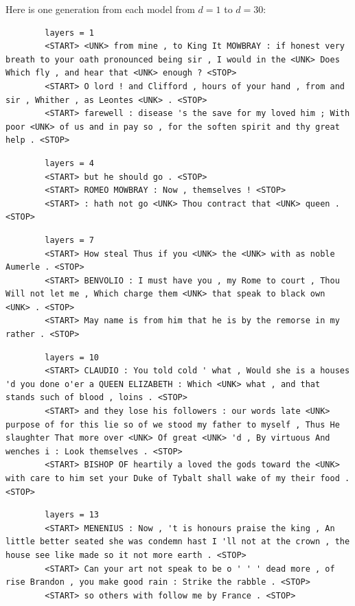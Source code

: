 \documentclass[12pt]{article}
\theoremstyle{definitionstyle}
\begin{document}
    Here is one generation from each model from $d=1$ to $d=30$:
    \begin{lstlisting}
        layers = 1
        <START> <UNK> from mine , to King It MOWBRAY : if honest very breath to your oath pronounced being sir , I would in the <UNK> Does Which fly , and hear that <UNK> enough ? <STOP>
        <START> O lord ! and Clifford , hours of your hand , from and sir , Whither , as Leontes <UNK> . <STOP>
        <START> farewell : disease 's the save for my loved him ; With poor <UNK> of us and in pay so , for the soften spirit and thy great help . <STOP>
    \end{lstlisting}
    \begin{lstlisting}
        layers = 4
        <START> but he should go . <STOP>
        <START> ROMEO MOWBRAY : Now , themselves ! <STOP>
        <START> : hath not go <UNK> Thou contract that <UNK> queen . <STOP>
    \end{lstlisting}
    \begin{lstlisting}
        layers = 7
        <START> How steal Thus if you <UNK> the <UNK> with as noble Aumerle . <STOP>
        <START> BENVOLIO : I must have you , my Rome to court , Thou Will not let me , Which charge them <UNK> that speak to black own <UNK> . <STOP>
        <START> May name is from him that he is by the remorse in my rather . <STOP>
    \end{lstlisting}
    \begin{lstlisting}
        layers = 10
        <START> CLAUDIO : You told cold ' what , Would she is a houses 'd you done o'er a QUEEN ELIZABETH : Which <UNK> what , and that stands such of blood , loins . <STOP>
        <START> and they lose his followers : our words late <UNK> purpose of for this lie so of we stood my father to myself , Thus He slaughter That more over <UNK> Of great <UNK> 'd , By virtuous And wenches i : Look themselves . <STOP>
        <START> BISHOP OF heartily a loved the gods toward the <UNK> with care to him set your Duke of Tybalt shall wake of my their food . <STOP>
    \end{lstlisting}
    \begin{lstlisting}
        layers = 13
        <START> MENENIUS : Now , 't is honours praise the king , An little better seated she was condemn hast I 'll not at the crown , the house see like made so it not more earth . <STOP>
        <START> Can your art not speak to be o ' ' ' dead more , of rise Brandon , you make good rain : Strike the rabble . <STOP>
        <START> so others with follow me by France . <STOP>
    \end{lstlisting}
\end{document}
